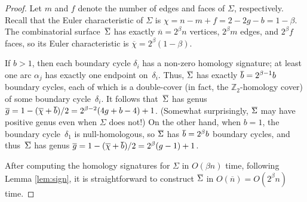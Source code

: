 \documentclass[letterpaper,review]{siamart190516}
\def\Z{\mathbb{Z}}
\def\dualarc{\alpha}
\def\Sigmabar{\overline{\smash{\Sigma}\vphantom{t}}}
\def\bbar{\overline{\smash{b}\vphantom{t}}}
\def\nbar{\overline{n}}
\def\gbar{\overline{g}}
\def\chibar{\overline{\chi}}
\begin{document}
\begin{proof}
Let $m$ and $f$ denote the number of edges and faces of $\Sigma$, respectively.  Recall that the Euler characteristic of $\Sigma$ is $\chi = n - m + f = 2 - 2g - b = 1 - \beta$.  The combinatorial surface~$\Sigmabar$ has exactly $\nbar = 2^\beta n$ vertices, $2^\beta m$ edges, and $2^\beta f$ faces, so its Euler characteristic is $\chibar = 2^\beta (1-\beta)$.

If $b>1$, then each boundary cycle $\delta_i$ has a non-zero homology signature; at least one arc $\dualarc_j$ has exactly one endpoint on~$\delta_i$.  Thus, $\Sigmabar$ has exactly $\bbar = 2^{\beta-1} b$ boundary cycles, each of which is a double-cover (in fact, the $\Z_2$-homology cover) of some boundary cycle~$\delta_i$.  It follows that~$\Sigmabar$ has genus $\gbar = 1-(\chibar+\bbar)/2 = {2^{\beta-2} ({4g+b-4}) + 1}$.  (Somewhat surprisingly, $\Sigmabar$ may have positive genus even when $\Sigma$ does not!)  On the other hand, when $b=1$, the boundary cycle~$\delta_1$ is null-homologous, so $\Sigmabar$ has $\bbar = 2^\beta b$ boundary cycles, and thus~$\Sigmabar$ has genus $\gbar = {1-(\chibar+\bbar)/2} =  {2^\beta (g-1) + 1}$.

After computing the homology signatures for $\Sigma$ in $O(\beta n)$ time, following Lemma \ref{lem:sign}, it is straightforward to construct $\Sigmabar$ in $O(\nbar) = O(2^\beta n)$ time.
\end{proof}
\end{document}
